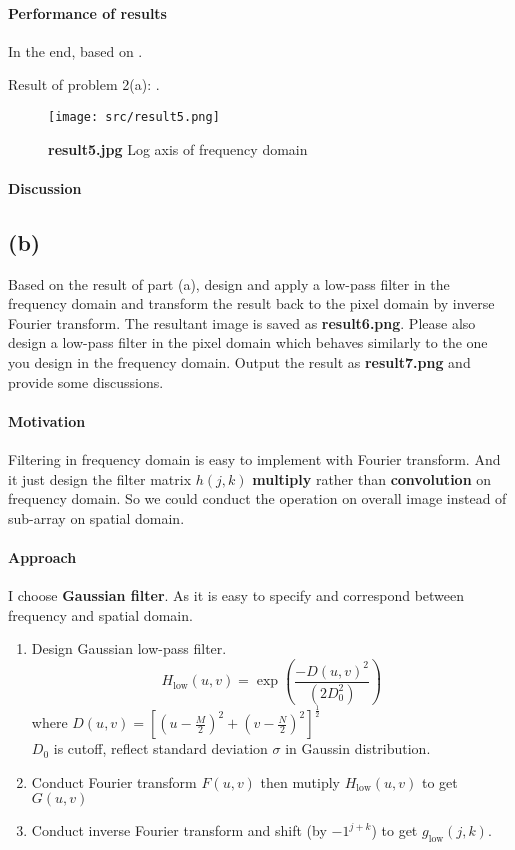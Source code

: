 \paragraph{Performance of results}
In the end, based on .

Result of problem 2(a): .
\begin{figure}
    \centering
    \texttt{[image: src/result5.png]}
    \caption{\textbf{result5.jpg} Log axis of frequency domain}
    \label{result5}
\end{figure}

\paragraph{Discussion}

\subsection{(b)}\label{2_b}
Based on the result of part (a), design and apply a low-pass filter in the frequency domain and transform the result back to the pixel domain by inverse Fourier transform. The resultant image is saved as \textbf{result6.png}. Please also design a low-pass filter in the pixel domain which behaves similarly to the one you design in the frequency domain. Output the result as \textbf{result7.png} and provide some discussions.

\paragraph{Motivation}
Filtering in frequency domain is easy to implement with Fourier transform. And it just design the filter matrix \(h(j, k)\) \textbf{multiply} rather than \textbf{convolution} on frequency domain. So we could conduct the operation on overall image instead of sub-array on spatial domain.

\paragraph{Approach}
I choose \textbf{Gaussian filter}. As it is easy to specify and correspond between frequency and spatial domain.
\begin{enumerate}
    \item Design Gaussian low-pass filter.
	\[
	    H_{\mbox{low}}(u, v) = \exp \left(\frac{-D(u, v)^2}{(2D_{0}^{2})} \right)
	\]
	where \(D(u, v) = [(u - \frac{M}{2})^{2} + (v - \frac{N}{2})^{2}]^{\frac{1}{2}}\) \\
	\(D_{0}\) is cutoff, reflect standard deviation \(\sigma\) in Gaussin distribution.
    \item Conduct Fourier transform \(F(u, v)\) then mutiply \(H_{\mbox{low}}(u, v)\) to get \(G(u, v)\)
    \item Conduct inverse Fourier transform and shift (by \(-1^{j + k}\)) to get \(g_{\mbox{low}}(j, k)\).
\end{enumerate}

